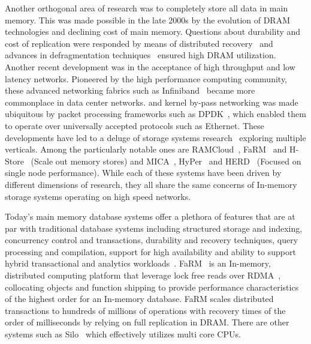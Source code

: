 Another orthogonal area of research was to completely store all data in main memory.
This was made possible in the late 2000s by the evolution of DRAM technologies and declining cost of main memory.
Questions about durability and cost of replication 
were responded by means of distributed recovery~\cite{ongaro2011fast} and advances in defragmentation techniques~\cite{ramcloudfast} 
ensured high DRAM utilization. Another recent development was in the acceptance of high throughput and low latency networks. 
Pioneered by the high performance computing community, these advanced networking fabrics 
such as Infiniband~\cite{pfister2001introduction} became more commonplace in 
data center networks. and kernel by-pass networking was made ubiquitous by packet processing 
frameworks such as DPDK~\cite{dpdk}, which enabled them to operate over universally accepted protocols
such as Ethernet. These developments have led to a deluge of storage systems research~\cite{mmdbmstutorial} 
exploring multiple verticals. Among the particularly notable ones are RAMCloud~\cite{ramcloud},
FaRM~\cite{farm} and H-Store~\cite{hstore} (Scale out memory stores) and
MICA~\cite{mica}, HyPer~\cite{hyper} and HERD~\cite{herd} (Focused on single node performance).
While each of these systems have been driven by different dimensions 
of research, they all share the same concerns of In-memory storage systems 
operating on high speed networks.

Today's main memory database systems offer a plethora of features that are at par with traditional
database systems including structured storage and indexing, concurrency control and transactions,
 durability and recovery techniques, query processing and compilation, support for high availability and 
ability to support hybrid transactional and analytics workloads~\cite{mmdbmstutorial}.
FaRM~\cite{farm} is an In-memory, distributed computing platform that leverage lock free reads over RDMA~\cite{rdma},
collocating objects and function shipping to provide performance characteristics of the 
highest order for an In-memory database. FaRM scales distributed transactions to
hundreds of millions of operations with recovery times of the order of milliseconds by relying on 
full replication in DRAM. There are other systems such as Silo~\cite{silo} which effectively utilizes multi core CPUs.


